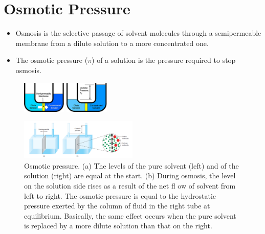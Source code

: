 \documentclass[a4paper,12pt,twocolumn]{article}
\begin{document}
\section{Osmotic Pressure}
\begin{itemize}
\item Osmosis is the selective passage of solvent molecules through a semipermeable membrane from a dilute solution to a more concentrated one.
\item The osmotic pressure ($\pi$) of a solution is the pressure required to stop osmosis.
\end{itemize}
\begin{figure}[h]
\centering
\includegraphics[width=0.185\textwidth, keepaspectratio]{reverse1.jpg} \qquad
\includegraphics[width=0.185\textwidth, keepaspectratio]{reverse2.jpg}
\end{figure}
\begin{figure}[h]
\centering
\includegraphics[width=0.5\textwidth]{Screenshot 2023-03-24 011415.png}
\caption{Osmotic pressure. (a) The levels of the pure solvent (left) and of the solution (right) are equal at the start. (b) During
osmosis, the level on the solution side rises as a result of the net fl ow of solvent from left to right. The osmotic pressure is equal to
the hydrostatic pressure exerted by the column of fluid in the right tube at equilibrium. Basically, the same effect occurs when the pure
solvent is replaced by a more dilute solution than that on the right.}
\end{figure}
\end{document}
